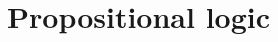 \documentclass[11pt,a4paper]{report}
\begin{document}



\part{Propositional logic}



% 
% 


% 
% 
% 


% 
% 



\end{document}
